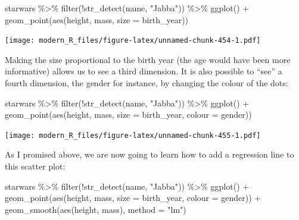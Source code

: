 \documentclass[
]{article}
\newenvironment{Shaded}{\begin{snugshade}}{\end{snugshade}}
\newcommand{\AttributeTok}[1]{\textcolor[rgb]{0.77,0.63,0.00}{#1}}
\newcommand{\FunctionTok}[1]{\textcolor[rgb]{0.00,0.00,0.00}{#1}}
\newcommand{\NormalTok}[1]{#1}
\newcommand{\SpecialCharTok}[1]{\textcolor[rgb]{0.00,0.00,0.00}{#1}}
\newcommand{\StringTok}[1]{\textcolor[rgb]{0.31,0.60,0.02}{#1}}
\begin{document}
\begin{Shaded}
\begin{Highlighting}[]
\NormalTok{starwars }\SpecialCharTok{\%\textgreater{}\%}
  \FunctionTok{filter}\NormalTok{(}\SpecialCharTok{!}\FunctionTok{str\_detect}\NormalTok{(name, }\StringTok{"Jabba"}\NormalTok{)) }\SpecialCharTok{\%\textgreater{}\%}
  \FunctionTok{ggplot}\NormalTok{() }\SpecialCharTok{+}
    \FunctionTok{geom\_point}\NormalTok{(}\FunctionTok{aes}\NormalTok{(height, mass, }\AttributeTok{size =}\NormalTok{ birth\_year))}
\end{Highlighting}
\end{Shaded}

\texttt{[image: modern\_R\_files/figure-latex/unnamed-chunk-454-1.pdf]}

Making the size proportional to the birth year (the age would have been more informative) allows
us to see a third dimension. It is also possible to ``see'' a fourth dimension, the gender for instance,
by changing the colour of the dots:

\begin{Shaded}
\begin{Highlighting}[]
\NormalTok{starwars }\SpecialCharTok{\%\textgreater{}\%}
  \FunctionTok{filter}\NormalTok{(}\SpecialCharTok{!}\FunctionTok{str\_detect}\NormalTok{(name, }\StringTok{"Jabba"}\NormalTok{)) }\SpecialCharTok{\%\textgreater{}\%}
  \FunctionTok{ggplot}\NormalTok{() }\SpecialCharTok{+}
    \FunctionTok{geom\_point}\NormalTok{(}\FunctionTok{aes}\NormalTok{(height, mass, }\AttributeTok{size =}\NormalTok{ birth\_year, }\AttributeTok{colour =}\NormalTok{ gender))}
\end{Highlighting}
\end{Shaded}

\texttt{[image: modern\_R\_files/figure-latex/unnamed-chunk-455-1.pdf]}

As I promised above, we are now going to learn how to add a regression line to this scatter plot:

\begin{Shaded}
\begin{Highlighting}[]
\NormalTok{starwars }\SpecialCharTok{\%\textgreater{}\%}
  \FunctionTok{filter}\NormalTok{(}\SpecialCharTok{!}\FunctionTok{str\_detect}\NormalTok{(name, }\StringTok{"Jabba"}\NormalTok{)) }\SpecialCharTok{\%\textgreater{}\%}
  \FunctionTok{ggplot}\NormalTok{() }\SpecialCharTok{+}
    \FunctionTok{geom\_point}\NormalTok{(}\FunctionTok{aes}\NormalTok{(height, mass, }\AttributeTok{size =}\NormalTok{ birth\_year, }\AttributeTok{colour =}\NormalTok{ gender)) }\SpecialCharTok{+}
    \FunctionTok{geom\_smooth}\NormalTok{(}\FunctionTok{aes}\NormalTok{(height, mass), }\AttributeTok{method  =} \StringTok{"lm"}\NormalTok{)}
\end{Highlighting}
\end{Shaded}
\end{document}

